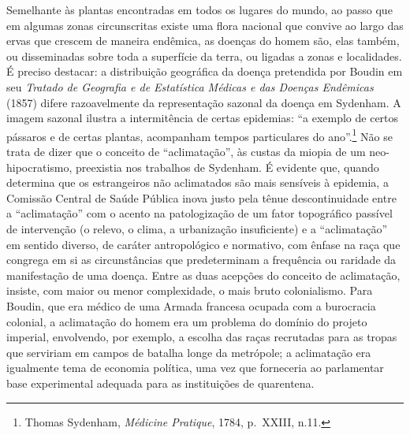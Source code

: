 Semelhante às plantas encontradas em todos os lugares do mundo, ao passo
que em algumas zonas circunscritas existe uma flora nacional que convive
ao largo das ervas que crescem de maneira endêmica, as doenças do homem
são, elas também, ou disseminadas sobre toda a superfície da terra, ou
ligadas a zonas e localidades. É preciso destacar: a distribuição
geográfica da doença pretendida por Boudin em seu \textit{Tratado de
Geografia e de Estatística Médicas e das Doenças Endêmicas} (1857)
difere razoavelmente da representação sazonal da doença em Sydenham. A
imagem sazonal ilustra a intermitência de certas epidemias: ``a exemplo
de certos pássaros e de certas plantas, acompanham tempos particulares
do ano''.\footnote{Thomas Sydenham, \textit{Médicine Pratique}, 1784,
  p.~XXIII, n.11.} Não se trata de dizer que o conceito de
``aclimatação'', às custas da miopia de um neo-hipocratismo, preexistia
nos trabalhos de Sydenham. É evidente que, quando determina que os
estrangeiros não aclimatados são mais sensíveis à epidemia, a Comissão
Central de Saúde Pública inova justo pela tênue descontinuidade entre a
``aclimatação'' com o acento na patologização de um fator topográfico
passível de intervenção (o relevo, o clima, a urbanização insuficiente)
e a ``aclimatação'' em sentido diverso, de caráter antropológico e
normativo, com ênfase na raça que congrega em si as circunstâncias que
predeterminam a frequência ou raridade da manifestação de uma doença.
Entre as duas acepções do conceito de aclimatação, insiste, com maior ou
menor complexidade, o mais bruto colonialismo. Para Boudin, que era
médico de uma Armada francesa ocupada com a burocracia colonial, a
aclimatação do homem era um problema do domínio do projeto imperial,
envolvendo, por exemplo, a escolha das raças recrutadas para as tropas
que serviriam em campos de batalha longe da metrópole; a aclimatação era
igualmente tema de economia política, uma vez que forneceria ao
parlamentar base experimental adequada para as instituições de
quarentena.

